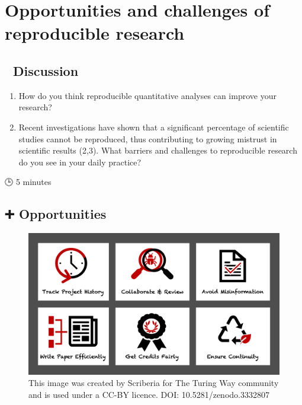 \documentclass[
  letterpaper,
  DIV=11,
  numbers=noendperiod,
  oneside]{scrreprt}
\providecommand{\tightlist}{%
  \setlength{\itemsep}{0pt}\setlength{\parskip}{0pt}}\usepackage{longtable,booktabs,array}
\begin{document}
\hypertarget{opportunities-and-challenges-of-reproducible-research}{%
\section{Opportunities and challenges of reproducible
research}\label{opportunities-and-challenges-of-reproducible-research}}

\subsection{\texorpdfstring{{💬} Discussion}{💬 Discussion}}

\begin{enumerate}
\def\labelenumi{\arabic{enumi}.}
\tightlist
\item
  How do you think reproducible quantitative analyses can improve your
  research?
\item
  Recent investigations have shown that a significant percentage of
  scientific studies cannot be reproduced, thus contributing to growing
  mistrust in scientific results (2,3). What barriers and challenges to
  reproducible research do you see in your daily practice?
\end{enumerate}

{🕒} 5 minutes

\subsection{\texorpdfstring{{➕} Opportunities}{➕ Opportunities}}

\begin{figure}

{\centering \includegraphics{images/paste-9DF4B400.png}

}

\caption{This image was created by Scriberia for The Turing Way
community and is used under a CC-BY licence. DOI:
10.5281/zenodo.3332807}

\end{figure}
\end{document}
